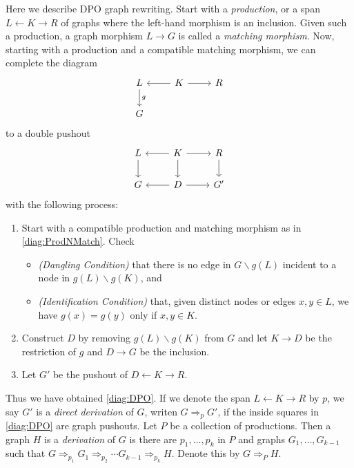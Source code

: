 \documentclass[10pt,a4paper]{article}
\newcommand{\define}[1]{\emph{#1}}
\newcommand{\unto}{\leftarrow}
\newcommand{\sm}{\smallsetminus}
\renewcommand{\(}{\left(}
\renewcommand{\)}{\right)}
\renewcommand{\{}{\left\lbrace}
\renewcommand{\}}{\right\rbrace}
\theoremstyle{remark}
\theoremstyle{definition}
\begin{document}
Here we describe DPO graph rewriting.  Start with a \define{production}, or a span $L \unto K \to R$ of graphs where the left-hand morphism is an inclusion.  Given such a production, a graph morphism $L \to G$ is called a \define{matching morphism}.  Now, starting with a production and a compatible matching morphism, we can complete the diagram
\begin{equation} \label{diag:ProdNMatch}
	\begin{tikzcd}
		L \arrow[]{d}{g} &
		K \arrow[]{l}{} \arrow[]{r}{}&
		R \\
		G
	\end{tikzcd}
\end{equation}
to a double pushout
\begin{equation} \label{diag:DPO}
	\begin{tikzcd} 
		L \arrow[]{d}{} &
		K \arrow[]{l}{} \arrow[]{r}{} \arrow[]{d}{}&
		R \arrow[]{d}{} \\
		G  &
		D \arrow[]{l}{} \arrow[]{r}{} &
		G'
	\end{tikzcd}
\end{equation}
with the following process:
\begin{enumerate}
	\item Start with a compatible production and matching morphism as in \eqref{diag:ProdNMatch}.  Check
		\begin{itemize}
			\item \textit{(Dangling Condition)} that there is no edge in $G \sm g(L)$ incident to a node in $g(L) \sm g(K)$, and
			\item \textit{(Identification Condition)} that, given distinct nodes or edges $x,y \in L$, we have $g(x) = g(y)$ only if $x,y \in K$.
		\end{itemize}
	\item Construct $D$ by removing $g(L) \sm g(K)$ from $G$ and let $K \to D$ be the restriction of $g$ and $D \to G$ be the inclusion.
	\item Let $G'$ be the pushout of $D \unto K \to R$.
\end{enumerate}
Thus we have obtained \eqref{diag:DPO}. If we denote the span $L \unto K \to R$ by $p$, we say $G'$ is a \define{direct derivation} of $G$, writen $G \Rightarrow_p G'$, if the inside squares in \eqref{diag:DPO} are graph pushouts. Let $P$ be a collection of productions.  Then a graph $H$ is a \define{derivation} of $G$ is there are $p_1, \dotsc, p_k$ in $P$ and graphs $G_1, \dotsc, G_{k-1}$ such that $G \Rightarrow_{p_1} G_1 \Rightarrow_{p_2} \dotsm G_{k-1}\Rightarrow_{p_k} H$.  Denote this by $G \Rightarrow_P H$.
\end{document}
